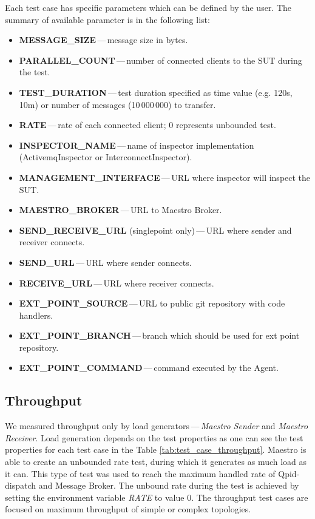 Each test case has specific parameters which can be defined by the user. The summary of available parameter is in the following list:
\begin{itemize}
	\setlength\itemsep{0em}
	\item \textbf{MESSAGE\_SIZE}\,---\,message size in bytes.
	\item \textbf{PARALLEL\_COUNT}\,---\,number of connected clients to the SUT during the test.
	\item \textbf{TEST\_DURATION}\,---\,test duration specified as time value (e.g. 120s, 10m) or number of messages (10\,000\,000) to transfer.
	\item \textbf{RATE}\,---\,rate of each connected client; 0 represents unbounded test.
	\item \textbf{INSPECTOR\_NAME}\,---\,name of inspector implementation (ActivemqInspector or InterconnectInspector).
	\item \textbf{MANAGEMENT\_INTERFACE}\,---\,URL where inspector will inspect the SUT.
	\item \textbf{MAESTRO\_BROKER}\,---\,URL to Maestro Broker.
	\item \textbf{SEND\_RECEIVE\_URL} (singlepoint only)\,---\,URL where sender and receiver connects.
	\item \textbf{SEND\_URL}\,---\,URL where sender connects.
	\item \textbf{RECEIVE\_URL}\,---\,URL where receiver connects.
	\item \textbf{EXT\_POINT\_SOURCE}\,---\,URL to public git repository with code handlers.
	\item \textbf{EXT\_POINT\_BRANCH}\,---\,branch which should be used for ext point repository.
	\item \textbf{EXT\_POINT\_COMMAND}\,---\,command executed by the Agent.
\end{itemize}

\subsection{Throughput}
\label{Throughput}
We measured throughput only by load generators\,---\,\emph{Maes\-tro Sender} and \emph{Maestro Receiver}. Load generation depends on the test properties as one can see the test properties for each test case in the Table \ref{tab:test_case_throughput}. Maestro is able to create an unbounded rate test, during which it generates as much load as it can. This type of test was used to reach the maximum handled rate of Qpid-dispatch and Message Broker. The unbound rate during the test is achieved by setting the environment variable \emph{RATE} to value 0. The throughput test cases are focused on maximum throughput of simple or complex topologies.

